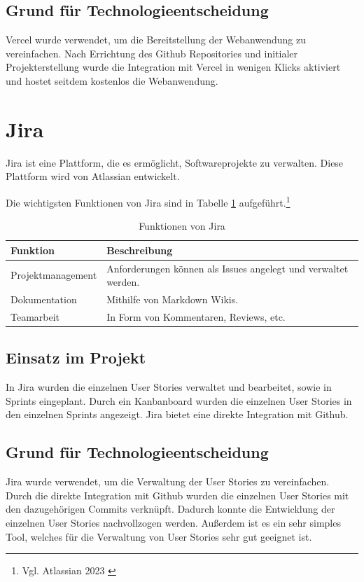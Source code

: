 \subsection{Grund für Technologieentscheidung}
\label{sub:vercel-reason}

Vercel wurde verwendet, um die Bereitstellung der Webanwendung zu vereinfachen.
Nach Errichtung des Github Repositories und initialer Projekterstellung wurde die Integration mit Vercel in wenigen Klicks aktiviert und hostet seitdem kostenlos die Webanwendung.

\clearpage
\section{Jira}
\label{sec:jira}

Jira ist eine Plattform, die es ermöglicht, Softwareprojekte zu verwalten.
Diese Plattform wird von Atlassian entwickelt.

Die wichtigsten Funktionen von Jira sind in Tabelle \ref{tab:jira} aufgeführt.\footnote{Vgl. Atlassian 2023 \cite{attlassian2023}}

\begin{table}[ht]
  \begin{tabularx}{\textwidth}{|l|X|}
  \hline
  \textbf{Funktion} & \textbf{Beschreibung} \\ \hline
  Projektmanagement & Anforderungen können als Issues angelegt und verwaltet werden. \\ \hline
  Dokumentation & Mithilfe von Markdown Wikis. \\ \hline
  Teamarbeit & In Form von Kommentaren, Reviews, etc. \\ \hline
  \end{tabularx}
  \caption{Funktionen von Jira}
  \label{tab:jira}
\end{table}

\subsection{Einsatz im Projekt}
\label{sub:jira-use}

In Jira wurden die einzelnen User Stories verwaltet und bearbeitet, sowie in Sprints eingeplant.
Durch ein Kanbanboard wurden die einzelnen User Stories in den einzelnen Sprints angezeigt.
Jira bietet eine direkte Integration mit Github.

\subsection{Grund für Technologieentscheidung}
\label{sub:jira-reason}

Jira wurde verwendet, um die Verwaltung der User Stories zu vereinfachen.
Durch die direkte Integration mit Github wurden die einzelnen User Stories mit den dazugehörigen Commits verknüpft.
Dadurch konnte die Entwicklung der einzelnen User Stories nachvollzogen werden.
Außerdem ist es ein sehr simples Tool, welches für die Verwaltung von User Stories sehr gut geeignet ist.
